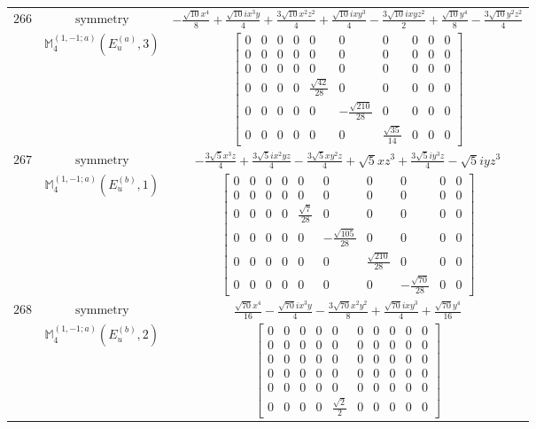 \documentclass[fleqn,8pt,landscape]{jsarticle}
\begin{document}
\begin{longtable}{ccc}
$ 266 $ & $ \text{symmetry} $ & $ - \frac{\sqrt{10} x^{4}}{8} + \frac{\sqrt{10} i x^{3} y}{4} + \frac{3 \sqrt{10} x^{2} z^{2}}{4} + \frac{\sqrt{10} i x y^{3}}{4} - \frac{3 \sqrt{10} i x y z^{2}}{2} + \frac{\sqrt{10} y^{4}}{8} - \frac{3 \sqrt{10} y^{2} z^{2}}{4} $ \\
$  $ & $ \mathbb{M}_{4}^{(1,-1;a)}(E_{u}^{(a)},3) $ & $ \begin{bmatrix} 0 & 0 & 0 & 0 & 0 & 0 & 0 & 0 & 0 & 0 \\ 0 & 0 & 0 & 0 & 0 & 0 & 0 & 0 & 0 & 0 \\ 0 & 0 & 0 & 0 & 0 & 0 & 0 & 0 & 0 & 0 \\ 0 & 0 & 0 & 0 & \frac{\sqrt{42}}{28} & 0 & 0 & 0 & 0 & 0 \\ 0 & 0 & 0 & 0 & 0 & - \frac{\sqrt{210}}{28} & 0 & 0 & 0 & 0 \\ 0 & 0 & 0 & 0 & 0 & 0 & \frac{\sqrt{35}}{14} & 0 & 0 & 0 \end{bmatrix} $ \\ \hline
$ 267 $ & $ \text{symmetry} $ & $ - \frac{3 \sqrt{5} x^{3} z}{4} + \frac{3 \sqrt{5} i x^{2} y z}{4} - \frac{3 \sqrt{5} x y^{2} z}{4} + \sqrt{5} x z^{3} + \frac{3 \sqrt{5} i y^{3} z}{4} - \sqrt{5} i y z^{3} $ \\
$  $ & $ \mathbb{M}_{4}^{(1,-1;a)}(E_{u}^{(b)},1) $ & $ \begin{bmatrix} 0 & 0 & 0 & 0 & 0 & 0 & 0 & 0 & 0 & 0 \\ 0 & 0 & 0 & 0 & 0 & 0 & 0 & 0 & 0 & 0 \\ 0 & 0 & 0 & 0 & \frac{\sqrt{7}}{28} & 0 & 0 & 0 & 0 & 0 \\ 0 & 0 & 0 & 0 & 0 & - \frac{\sqrt{105}}{28} & 0 & 0 & 0 & 0 \\ 0 & 0 & 0 & 0 & 0 & 0 & \frac{\sqrt{210}}{28} & 0 & 0 & 0 \\ 0 & 0 & 0 & 0 & 0 & 0 & 0 & - \frac{\sqrt{70}}{28} & 0 & 0 \end{bmatrix} $ \\ \hline
$ 268 $ & $ \text{symmetry} $ & $ \frac{\sqrt{70} x^{4}}{16} - \frac{\sqrt{70} i x^{3} y}{4} - \frac{3 \sqrt{70} x^{2} y^{2}}{8} + \frac{\sqrt{70} i x y^{3}}{4} + \frac{\sqrt{70} y^{4}}{16} $ \\
$  $ & $ \mathbb{M}_{4}^{(1,-1;a)}(E_{u}^{(b)},2) $ & $ \begin{bmatrix} 0 & 0 & 0 & 0 & 0 & 0 & 0 & 0 & 0 & 0 \\ 0 & 0 & 0 & 0 & 0 & 0 & 0 & 0 & 0 & 0 \\ 0 & 0 & 0 & 0 & 0 & 0 & 0 & 0 & 0 & 0 \\ 0 & 0 & 0 & 0 & 0 & 0 & 0 & 0 & 0 & 0 \\ 0 & 0 & 0 & 0 & 0 & 0 & 0 & 0 & 0 & 0 \\ 0 & 0 & 0 & 0 & \frac{\sqrt{2}}{2} & 0 & 0 & 0 & 0 & 0 \end{bmatrix} $ \\ \hline

\end{longtable}
\end{document}
